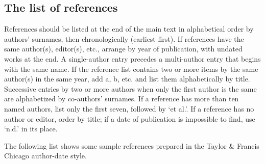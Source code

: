 \documentclass[]{interact}
\theoremstyle{plain}%
\theoremstyle{definition}
\theoremstyle{remark}
\begin{document}
\hypertarget{the-list-of-references}{%
\subsection{The list of references}\label{the-list-of-references}}

References should be listed at the end of the main text in alphabetical order by authors' surnames, then chronologically (earliest first). If references have the same author(s), editor(s), etc., arrange by year of publication, with undated works at the end.
A single-author entry precedes a multi-author entry that begins with the same name.
If the reference list contains two or more items by the same author(s) in the same year, add a, b, etc. and list them alphabetically by title.
Successive entries by two or more authors when only the first author is the same are alphabetized by co-authors' surnames.
If a reference has more than ten named authors, list only the first seven, followed by `et al.'.
If a reference has no author or editor, order by title; if a date of publication is impossible to find, use `n.d.' in its place.

The following list shows some sample references prepared in the Taylor \& Francis Chicago author-date style.

\citep{Ade09, Alb05}






\end{document}
